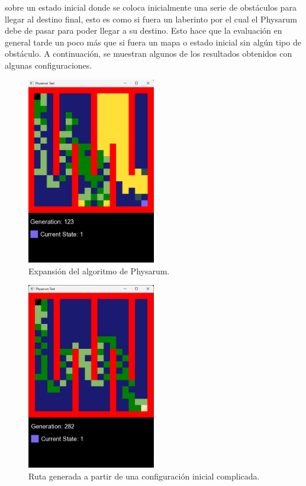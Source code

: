         sobre un estado inicial donde se coloca inicialmente una
        serie de obst\'aculos para llegar al destino final, esto es como
        si fuera un laberinto por el cual el Physarum debe de pasar
        para poder llegar a su destino. Esto hace que la evaluaci\'on
        en general tarde un poco m\'as que si fuera un mapa o estado
        inicial sin alg\'un tipo de obst\'aculo.
    \vskip 0.5cm
    A continuaci\'on, se muestran algunos de los resultados
        obtenidos con algunas configuraciones.
    \vskip 0.5cm
    \begin{figure}[htbp]
        \centering
        \includegraphics[width=0.5\textwidth]{./images/Pruebas/simulador/image061.png}
        \caption{Expansi\'on del algoritmo de Physarum.}
        \label{fig:Ruta 61}
    \end{figure}
    \vskip 0.5cm
    \begin{figure}[htbp]
        \centering
        \includegraphics[width=0.5\textwidth]{./images/Pruebas/simulador/image063.png}
        \caption{Ruta generada a partir de una configuraci\'on inicial complicada.}
        \label{fig:Ruta 63}
    \end{figure}
